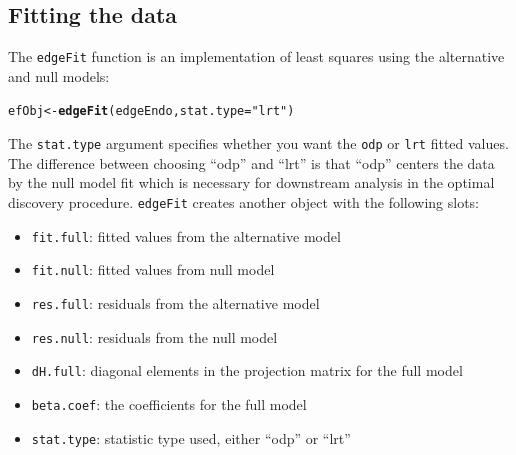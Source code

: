 \documentclass{article}\usepackage[]{graphicx}\usepackage[]{color}
\makeatletter
\newcommand{\hlstr}[1]{\textcolor[rgb]{0.192,0.494,0.8}{#1}}%
\newcommand{\hlstd}[1]{\textcolor[rgb]{0.345,0.345,0.345}{#1}}%
\newcommand{\hlkwb}[1]{\textcolor[rgb]{0.69,0.353,0.396}{#1}}%
\newcommand{\hlkwc}[1]{\textcolor[rgb]{0.333,0.667,0.333}{#1}}%
\newcommand{\hlkwd}[1]{\textcolor[rgb]{0.737,0.353,0.396}{\textbf{#1}}}%
\newenvironment{kframe}{%
 \def\at@end@of@kframe{}%
 \ifinner\ifhmode%
  \def\at@end@of@kframe{\end{minipage}}%
  \begin{minipage}{\columnwidth}%
 \fi\fi%
 \def\FrameCommand##1{\hskip\@totalleftmargin \hskip-\fboxsep
 \colorbox{shadecolor}{##1}\hskip-\fboxsep
     \hskip-\linewidth \hskip-\@totalleftmargin \hskip\columnwidth}%
 \MakeFramed {\advance\hsize-\width
   \@totalleftmargin\z@ \linewidth\hsize
   \@setminipage}}%
 {\par\unskip\endMakeFramed%
 \at@end@of@kframe}
\newenvironment{knitrout}{}{} %
\makeatother
\begin{document}
\subsection{Fitting the data}
The {\tt edgeFit} function is an implementation of least squares using the alternative and null models:
\begin{knitrout}
\color{fgcolor}\begin{kframe}
\begin{alltt}
\hlstd{efObj} \hlkwb{<-} \hlkwd{edgeFit}\hlstd{(edgeEndo,} \hlkwc{stat.type} \hlstd{=} \hlstr{"lrt"}\hlstd{)}
\end{alltt}
\end{kframe}
\end{knitrout}
The {\tt stat.type} argument specifies whether you want the {\tt odp} or {\tt lrt} fitted values. The difference between choosing ``odp'' and ``lrt'' is that ``odp'' centers the data by the null model fit which is necessary for downstream analysis in the optimal discovery procedure. {\tt edgeFit} creates another object with the following slots:
\begin{itemize}
\item {\tt fit.full}: fitted values from the alternative model
\item {\tt fit.null}: fitted values from null model
\item {\tt res.full}: residuals from the alternative model
\item {\tt res.null}: residuals from the null model
\item {\tt dH.full}: diagonal elements in the projection matrix for the full model
\item {\tt beta.coef}: the coefficients for the full model
\item {\tt stat.type}: statistic type used, either ``odp'' or ``lrt''
\end{itemize}
\end{document}

